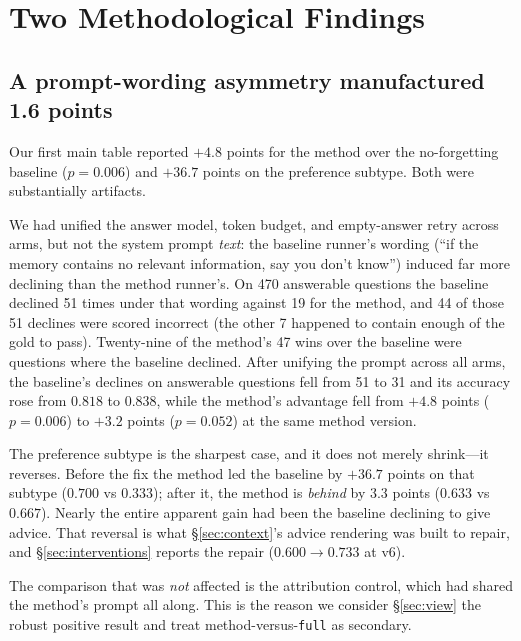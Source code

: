 \documentclass[11pt]{article}
\newcommand{\arm}[1]{\texttt{#1}}
\begin{document}
\section{Two Methodological Findings}
\label{sec:methodological}

\subsection{A prompt-wording asymmetry manufactured 1.6 points}
\label{sec:promptbug}

Our first main table reported $+4.8$ points for the method over the no-forgetting baseline ($p = 0.006$) and $+36.7$ points on the preference subtype. Both were substantially artifacts.

We had unified the answer model, token budget, and empty-answer retry across arms, but not the system prompt \emph{text}: the baseline runner's wording (``if the memory contains no relevant information, say you don't know'') induced far more declining than the method runner's. On 470 answerable questions the baseline declined 51 times under that wording against 19 for the method, and 44 of those 51 declines were scored incorrect (the other 7 happened to contain enough of the gold to pass). Twenty-nine of the method's 47 wins over the baseline were questions where the baseline declined. After unifying the prompt across all arms, the baseline's declines on answerable questions fell from 51 to 31 and its accuracy rose from $0.818$ to $0.838$, while the method's advantage fell from $+4.8$ points ($p = 0.006$) to $+3.2$ points ($p = 0.052$) at the same method version.

The preference subtype is the sharpest case, and it does not merely shrink---it reverses. Before the fix the method led the baseline by $+36.7$ points on that subtype ($0.700$ vs $0.333$); after it, the method is \emph{behind} by $3.3$ points ($0.633$ vs $0.667$). Nearly the entire apparent gain had been the baseline declining to give advice. That reversal is what \S\ref{sec:context}'s advice rendering was built to repair, and \S\ref{sec:interventions} reports the repair ($0.600 \rightarrow 0.733$ at v6).

The comparison that was \emph{not} affected is the attribution control, which had shared the method's prompt all along. This is the reason we consider \S\ref{sec:view} the robust positive result and treat method-versus-\arm{full} as secondary.
\end{document}
